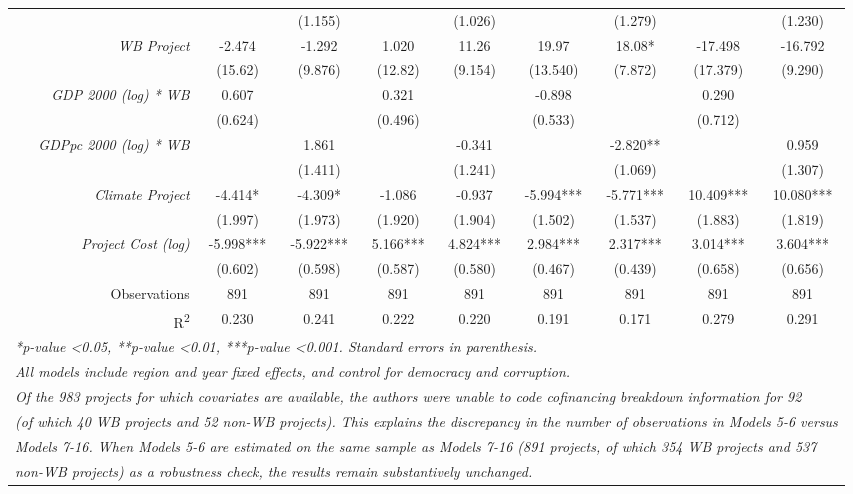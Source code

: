 \documentclass{article}
\begin{document}
\begin{singlespace}
\begin{table}[H]
{\begin{tabular}{rcccccccc}
			\textit{} &  & (1.155) &  & (1.026) &  & (1.279) &  & (1.230) \\
			\textit{WB Project} & -2.474 & -1.292 & 1.020 & 11.26 & 19.97 & 18.08* & -17.498 & -16.792 \\
			\textit{} & (15.62) & (9.876) & (12.82) & (9.154) & (13.540) & (7.872) & (17.379) & (9.290) \\
			\textit{GDP 2000 (log) * WB} & 0.607 &  & 0.321 &  & -0.898 &  & 0.290 &  \\
			\textit{} & (0.624) &  & (0.496) &  & (0.533) &  & (0.712) &  \\
			\textit{GDPpc 2000 (log) * WB} &  & 1.861 &  & -0.341 &  & -2.820** &  & 0.959 \\
			\textit{} &  & (1.411) &  & (1.241) &  & (1.069) &  & (1.307) \\
			\textit{Climate Project} & -4.414* & -4.309* & -1.086 & -0.937 & -5.994*** & -5.771*** & 10.409*** & 10.080*** \\
			\textit{} & (1.997) & (1.973) & (1.920) & (1.904) & (1.502) & (1.537) & (1.883) & (1.819) \\
			\textit{Project Cost (log)} & -5.998*** & -5.922*** & 5.166*** & 4.824*** & 2.984*** & 2.317*** & 3.014*** & 3.604*** \\
			\textit{} & (0.602) & (0.598) & (0.587) & (0.580) & (0.467) & (0.439) & (0.658) & (0.656) \\ \hline
			Observations & 891 & 891 & 891 & 891 & 891 & 891 & 891 & 891 \\
			R\textsuperscript{2} & 0.230 & 0.241 & 0.222 & 0.220 & 0.191 & 0.171 & 0.279 & 0.291 \\ \hline
			\multicolumn{9}{l}{\textit{*p-value \textless 0.05, **p-value \textless 0.01, ***p-value \textless 0.001.  Standard errors in parenthesis.}} \\
			\multicolumn{9}{l}{\textit{All models include region and year fixed effects, and control for democracy and corruption.}} \\
			\multicolumn{9}{l}{\textit{Of the 983 projects for which covariates are available, the authors were unable to code cofinancing breakdown information for 92}} \\
			\multicolumn{9}{l}{\textit{(of which 40 WB projects and 52 non-WB projects). This explains the discrepancy in the number of observations in Models 5-6 versus}} \\
			\multicolumn{9}{l}{\textit{Models 7-16. When Models 5-6 are estimated on the same sample as Models 7-16 (891 projects, of which 354 WB projects and 537}} \\
			\multicolumn{9}{l}{\textit{non-WB projects) as a robustness check, the results remain substantively unchanged.}}
		\end{tabular}%
	}
\end{table}
\end{singlespace} 							
\end{document}
